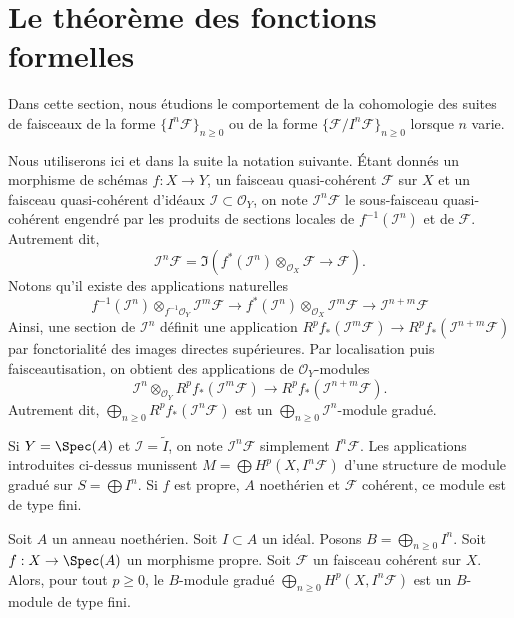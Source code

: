 \section{Le théorème des fonctions formelles}
\label{section-theorem-formal-functions}

\noindent
Dans cette section, nous étudions le comportement de la cohomologie des
suites de faisceaux de la forme $\{I^n\mathcal{F}\}_{n \geq 0}$
ou de la forme $\{\mathcal{F}/I^n\mathcal{F}\}_{n \geq 0}$ lorsque
$n$ varie.

\medskip\noindent
Nous utiliserons ici et dans la suite la notation suivante.
Étant donnés un morphisme de schémas $f : X \to Y$, un faisceau quasi-cohérent
$\mathcal{F}$ sur $X$ et un faisceau quasi-cohérent d'idéaux
$\mathcal{I} \subset \mathcal{O}_Y$, on note
$\mathcal{I}^n\mathcal{F}$ le sous-faisceau quasi-cohérent engendré
par les produits de sections locales de $f^{-1}(\mathcal{I}^n)$ et de
$\mathcal{F}$. Autrement dit,
$$
\mathcal{I}^n\mathcal{F}
=
\Im\left(
f^*(\mathcal{I}^n) \otimes_{\mathcal{O}_X} \mathcal{F}
\longrightarrow
\mathcal{F}
\right).
$$
Notons qu'il existe des applications naturelles
$$
f^{-1}(\mathcal{I}^n) \otimes_{f^{-1}\mathcal{O}_Y} \mathcal{I}^m\mathcal{F}
\longrightarrow
f^*(\mathcal{I}^n) \otimes_{\mathcal{O}_X} \mathcal{I}^m\mathcal{F}
\longrightarrow
\mathcal{I}^{n + m}\mathcal{F}
$$
Ainsi, une section de $\mathcal{I}^n$ définit une
application $R^pf_*(\mathcal{I}^m\mathcal{F}) \to
R^pf_*(\mathcal{I}^{n + m}\mathcal{F})$ par fonctorialité
des images directes supérieures. Par localisation puis faisceautisation,
on obtient des applications de $\mathcal{O}_Y$-modules
$$
\mathcal{I}^n \otimes_{\mathcal{O}_Y} R^pf_*(\mathcal{I}^m\mathcal{F})
\longrightarrow
R^pf_*(\mathcal{I}^{n + m}\mathcal{F}).
$$
Autrement dit,
$\bigoplus_{n \geq 0} R^pf_*(\mathcal{I}^n\mathcal{F})$
est un $\bigoplus_{n \geq 0} \mathcal{I}^n$-module gradué.

\medskip\noindent
Si $Y = \Spec(A)$ et $\mathcal{I} = \widetilde{I}$, on note
$\mathcal{I}^n\mathcal{F}$ simplement $I^n\mathcal{F}$. Les applications
introduites ci-dessus munissent $M = \bigoplus H^p(X, I^n\mathcal{F})$ d'une
structure de module gradué sur $S = \bigoplus I^n$. Si $f$ est propre,
$A$ noethérien et $\mathcal{F}$ cohérent, ce module
est de type fini.

\begin{lemma}
\label{lemma-cohomology-powers-ideal-times-F}
\begin{reference}
\cite[III Cor 3.3.2]{EGA}
\end{reference}
Soit $A$ un anneau noethérien.
Soit $I \subset A$ un idéal.
Posons $B = \bigoplus_{n \geq 0} I^n$.
Soit $f : X \to \Spec(A)$ un morphisme propre.
Soit $\mathcal{F}$ un faisceau cohérent sur $X$.
Alors, pour tout $p \geq 0$, le $B$-module gradué
$\bigoplus_{n \geq 0} H^p(X, I^n\mathcal{F})$ est
un $B$-module de type fini.
\end{lemma}

